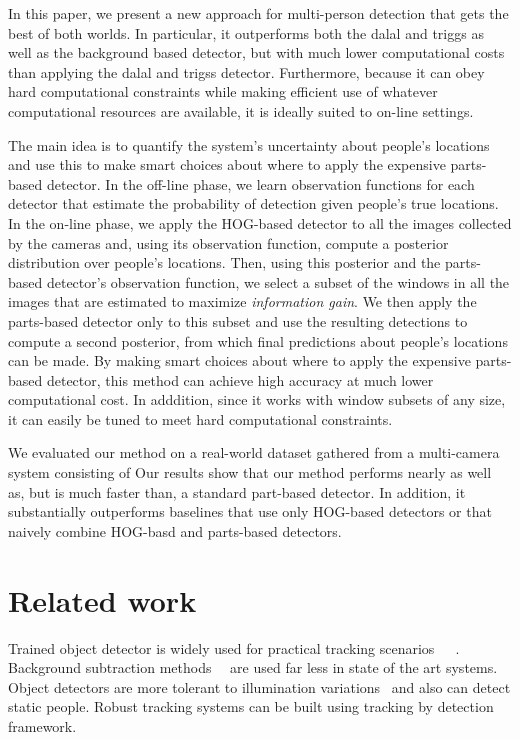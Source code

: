 \documentclass[10pt,twocolumn,letterpaper]{article}
\begin{document}
In this paper, we present a new approach for multi-person detection that gets the best of both worlds.  In particular, it outperforms both the dalal and triggs as well as the background based detector, but with much lower computational costs than applying the dalal and trigss detector.  Furthermore, because it can obey hard computational constraints while making efficient use of whatever computational resources are available, it is ideally suited to on-line settings.

The main idea is to quantify the system's uncertainty about people's locations and use this to make smart choices about where to apply the expensive parts-based detector.  In the off-line phase, we learn observation functions for each detector that estimate the probability of detection given people's true locations.  In the on-line phase, we apply the HOG-based detector to all the images collected by the cameras and, using its observation function, compute a posterior distribution over people's locations.  Then, using this posterior and the parts-based detector's observation function, we select a subset of the windows in all the images that are estimated to maximize \emph{information gain}.  We then apply the parts-based detector only to this subset and use the resulting detections to compute a second posterior, from which final predictions about people's locations can be made.  By making smart choices about where to apply the expensive parts-based detector, this method can achieve high accuracy at much lower computational cost.  In adddition, since it works with window subsets of any size, it can easily be tuned to meet hard computational constraints.  

We evaluated our method on a real-world dataset gathered from a multi-camera system consisting of   Our results show that our method performs nearly as well as, but is much faster than, a standard part-based detector.  In addition, it substantially outperforms baselines that use only HOG-based detectors or that naively combine HOG-basd and parts-based detectors.

\section {Related work}

Trained object detector is widely used for practical tracking scenarios~\cite{Pami-11}~\cite{POM-main}~\cite{MIL-obj1}. Background subtraction methods~\cite{bk1}~\cite{bk2-bayesian} are used far less in state of the art systems. Object detectors are more tolerant to illumination variations~\cite{ObjDet-1} and also can detect static people. Robust tracking systems can be built using  tracking by detection framework.
\end{document}
